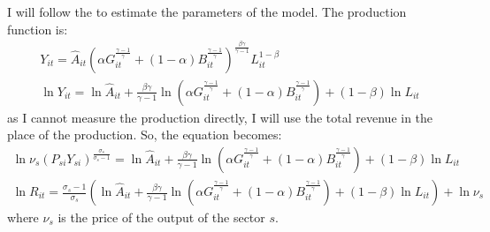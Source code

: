 I will follow the \cite{kmenta1967estimation} to estimate the parameters of the model. The production function is:
\begin{gather*}
    Y_{it} = \hat{A}_{it}(
        \alpha G_{it}^{\frac{\gamma-1}{\gamma}} + (1-\alpha) B_{it}^{\frac{\gamma-1}{\gamma}}
    ) ^ {\frac{\beta\gamma}{\gamma-1}} L_{it}^{1-\beta}\\
    \ln Y_{it} = \ln \hat{A}_{it} + \frac{\beta\gamma}{\gamma-1} \ln(
        \alpha G_{it}^{\frac{\gamma-1}{\gamma}} + (1-\alpha) B_{it}^{\frac{\gamma-1}{\gamma}}
    ) + (1-\beta) \ln L_{it}
\end{gather*}
as I cannot measure the production directly, I will use the total revenue in the place of the production. So, the equation becomes:
\begin{gather*}
    \ln \nu_{s}(P_{si}Y_{si})^{\frac{\sigma_s}{\sigma_s - 1}} = \ln \hat{A}_{it} + \frac{\beta\gamma}{\gamma-1} \ln(
        \alpha G_{it}^{\frac{\gamma-1}{\gamma}} + (1-\alpha) B_{it}^{\frac{\gamma-1}{\gamma}}
    ) + (1-\beta) \ln L_{it}\\
    \ln R_{it} = \frac{\sigma_s - 1}{\sigma_s}({\ln \hat{A}_{it} + \frac{\beta\gamma}{\gamma-1} \ln(
        \alpha G_{it}^{\frac{\gamma-1}{\gamma}} + (1-\alpha) B_{it}^{\frac{\gamma-1}{\gamma}}
    ) + (1-\beta) \ln L_{it}}) + \ln \nu_{s}
\end{gather*}
where $\nu_{s}$ is the price of the output of the sector $s$.


